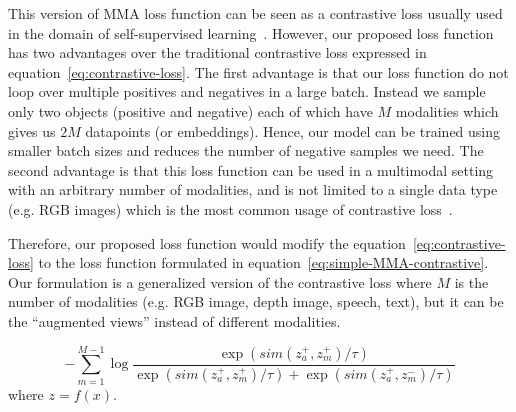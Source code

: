 \documentclass[sigconf,natbib=true,anonymous=true]{acmart}
\newcommand{\todokdinline}[1]{\todo[color=red!20,inline]{{KD: \small #1}}}
\begin{document}
This version of MMA loss function can be seen as a contrastive loss usually used in the domain of self-supervised learning~\cite{chen2020simple}. However, our proposed loss function has two advantages over the traditional contrastive loss expressed in equation~\ref{eq:contrastive-loss}. The first advantage is that our loss function do not loop over multiple positives and negatives in a large batch. Instead we sample only two objects (positive and negative) each of which have $M$ modalities which gives us $2M$ datapoints (or embeddings). Hence, our model can be trained using smaller batch sizes and reduces the number of negative samples we need. The second advantage is that this loss function can be used in a multimodal setting with an arbitrary number of modalities, and is not limited to a single data type (e.g. RGB images) which is the most common usage of contrastive loss~\cite{chen2020simple, NEURIPS2020_supervised_contrastive}.


Therefore, our proposed loss function would modify the equation~\ref{eq:contrastive-loss} to the loss function formulated in equation~\ref{eq:simple-MMA-contrastive}. Our formulation is a generalized version of the contrastive loss where $M$ is the number of modalities (e.g. RGB image, depth image, speech, text), but it can be the ``augmented views'' instead of different modalities.


\begin{equation}\label{eq:simple-MMA-contrastive}
    -\sum_{m=1}^{M-1} \log \frac{\exp (sim(z_a^+ , z_{m}^{+})/ \tau) }{ \exp (sim(z_a^+ , z_{m}^{+}) / \tau) + \exp (sim(z_a^+, z_{m}^{-}) / \tau)}
\end{equation}
where $z = f(x)$.




\end{document}
